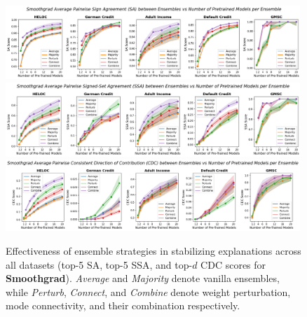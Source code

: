 \begin{figure}[bh]
    \centering
    \includegraphics[width=0.99\textwidth]{figures/sa_top5_smoothgrad.png}
    \includegraphics[width=0.99\textwidth]{figures/ssa_top5_smoothgrad.png}
    \includegraphics[width=0.99\textwidth]{figures/cdc_topd_smoothgrad.png}
    \caption{\small Effectiveness of ensemble strategies in stabilizing explanations across all datasets (top-5 SA, top-5 SSA, and top-$d$ CDC scores for \textbf{Smoothgrad}). \textit{Average} and \textit{Majority} denote vanilla ensembles, while \textit{Perturb}, \textit{Connect}, and \textit{Combine} denote weight perturbation, mode connectivity, and their combination respectively.}
    \label{fig:ensembles_all_sg}
\end{figure}

